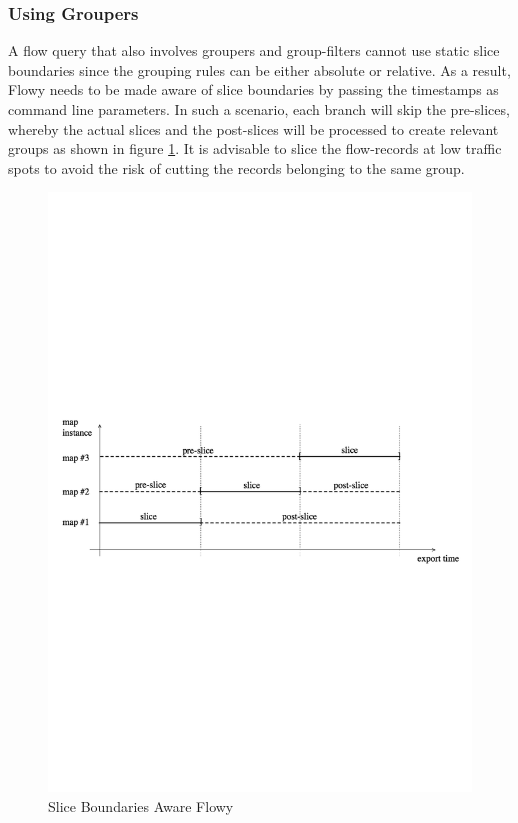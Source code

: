 \subsubsection{Using Groupers}\label{subsec:using-groupers}
A flow query that also involves groupers and group-filters cannot use static slice boundaries since the grouping rules can be either absolute or relative. As a result, Flowy needs to be made aware of slice boundaries by passing the timestamps as command line parameters. In such a scenario, each branch will skip the pre-slices, whereby the actual slices and the post-slices will be processed to create relevant groups as shown in figure \ref{fig:flowy-grouper-slices}. It is advisable to slice the flow-records at low traffic spots to avoid the risk of cutting the records belonging to the same group.
\begin{figure}[h!]
\begin{center}
  \includegraphics* [width=1.0\linewidth]{figures/flowy-grouper-slices}	
  \caption{Slice Boundaries Aware Flowy \cite{pnemeth:thesis:2010}}
  \label{fig:flowy-grouper-slices}
\end{center}
\end{figure}
